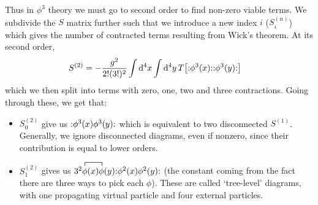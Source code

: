 \documentclass[notes.tex]{subfiles}
\begin{document}
Thus in $\phi^3$ theory we must go to second order to find non-zero viable terms. We subdivide the $S$ matrix further such that we introduce a new index $i$ ($S^{(n)}_i$) which gives the number of contracted terms resulting from Wick's theorem.
At its second order,
\begin{align*}
	S^{(2)} &= -\frac{g^2}{2!(3!)^2} \int\dd[4]{x}\int\dd[4]{y} T\qty[\mathbf{:}\phi^3(x)\mathbf{:}\mathbf{:}\phi^3(y)\mathbf{:}]
\end{align*}
which we then split into terms with zero, one, two and three contractions. Going through these, we get that:
\begin{itemize}
	\item $S_0^{(2)}$ give us $\mathbf{:}\phi^3(x)\phi^3(y)\mathbf{:}$ which is equivalent to two disconnected $S^{(1)}$. Generally, we ignore disconnected diagrams, even if nonzero, since their contribution is equal to lower orders.
	\item $S_1^{(2)}$ gives us $3^2\contraction{}{\phi}{(x)}{\phi}\phi(x)\phi(y)\normalorder{\phi^2(x)\phi^2(y)}$ (the constant coming from the fact there are three ways to pick each $\phi$). These are called `tree-level' diagrams, with one propagating virtual particle and four external particles.


\end{itemize}
\end{document}
